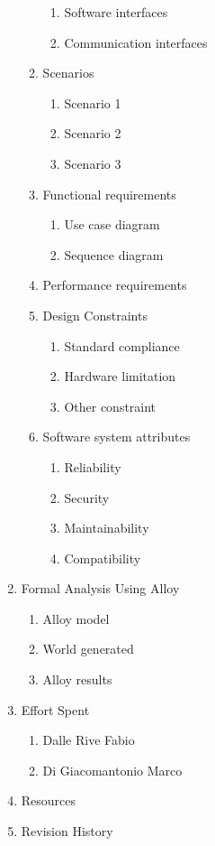 \documentclass{article}
\begin{document}
\begin{enumerate}
\begin{enumerate}
\begin{enumerate}
					\item Software interfaces
					\item Communication interfaces
				\end{enumerate}
				\item Scenarios
				\begin{enumerate}
					\item Scenario 1
					\item Scenario 2
					\item Scenario 3
				\end{enumerate}
				\item Functional requirements
				\begin{enumerate}
					\item Use case diagram
					\item Sequence diagram
				\end{enumerate}
				\item Performance requirements
				\item Design Constraints
				\begin{enumerate}
					\item Standard compliance
					\item Hardware limitation
					\item Other constraint
				\end{enumerate}
				\item Software system attributes
				\begin{enumerate}
					\item Reliability
					\item Security
					\item Maintainability
					\item Compatibility
				\end{enumerate}
			\end{enumerate}
			\item Formal Analysis Using Alloy
			\begin{enumerate}
				\item Alloy model
				\item World generated
				\item Alloy results
			\end{enumerate}
			\item Effort Spent
			\begin{enumerate}
			\item Dalle Rive Fabio
			\item Di Giacomantonio Marco
			\end{enumerate}
			\item Resources
			\item Revision History
	\end{enumerate}
	\newpage
\end{document}
